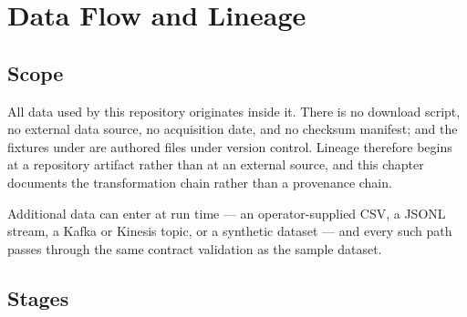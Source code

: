
\chapter{Data Flow and Lineage}
\label{ch:data-flow}

\section{Scope}

All data used by this repository originates inside it. There is no download
script, no external data source, no acquisition date, and no checksum
manifest;  and the fixtures under
 are authored files under version control. Lineage
therefore begins at a repository artifact rather than at an external source,
and this chapter documents the transformation chain rather than a provenance
chain.

Additional data can enter at run time --- an operator-supplied CSV, a JSONL
stream, a Kafka or Kinesis topic, or a synthetic dataset --- and every such
path passes through the same contract validation as the sample dataset.



\section{Stages}

